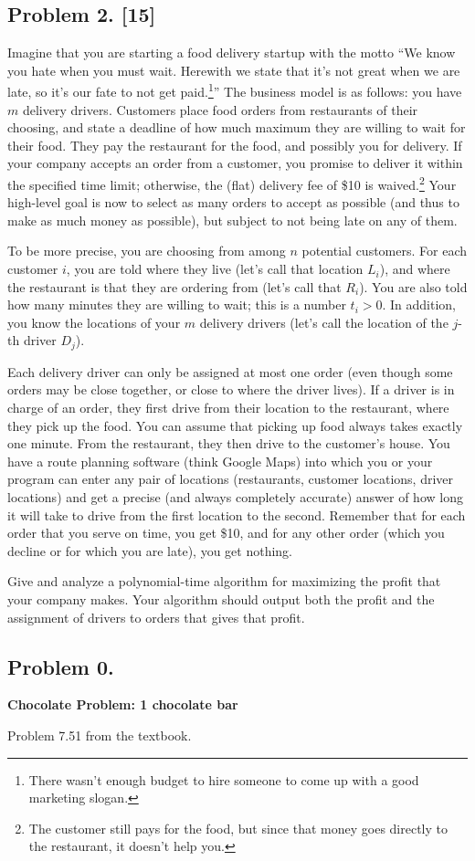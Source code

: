 \documentclass[10pt]{article}
\begin{document}
\subsection*{Problem 2. [15]}
Imagine that you are starting a food delivery startup with the motto ``We know you hate when you must wait. Herewith we state that it's not great when we are late, so it's our fate to not get paid.\footnote{There wasn't enough budget to hire someone to come up with a good marketing slogan.}''
The business model is as follows: you have $m$ delivery drivers. Customers place food orders from restaurants of their choosing, and state a deadline of how much maximum they are willing to wait for their food. They pay the restaurant for the food, and possibly you for delivery. If your company accepts an order from a customer, you promise to deliver it within the specified time limit; otherwise, the (flat) delivery fee of \$10 is waived.\footnote{The customer still pays for the food, but since that money goes directly to the restaurant, it doesn't help you.} Your high-level goal is now to select as many orders to accept as possible (and thus to make as much money as possible), but subject to not being late on any of them.

To be more precise, you are choosing from among $n$ potential customers. For each customer $i$, you are told where they live (let's call that location $L_i$), and where the restaurant is that they are ordering from (let's call that $R_i$). You are also told how many minutes they are willing to wait; this is a number $t_i > 0$. In addition, you know the locations of your $m$ delivery drivers (let's call the location of the $j$-th driver $D_j$).

Each delivery driver can only be assigned at most one order (even though some orders may be close together, or close to where the driver lives).
If a driver is in charge of an order, they first drive from their location to the restaurant, where they pick up the food. You can assume that picking up food always takes exactly one minute. From the restaurant, they then drive to the customer's house.
You have a route planning software (think Google Maps) into which you or your program can enter any pair of locations (restaurants, customer locations, driver locations) and get a precise (and always completely accurate) answer of how long it will take to drive from the first location to the second.
Remember that for each order that you serve on time, you get \$10, and for any other order (which you decline or for which you are late), you get nothing.

Give and analyze a polynomial-time algorithm for maximizing the profit that your company makes. Your algorithm should output both the profit and the assignment of drivers to orders that gives that profit.

\subsection*{Problem 0.}
\textbf{Chocolate Problem: 1 chocolate bar}

Problem 7.51 from the textbook.
\end{document}
